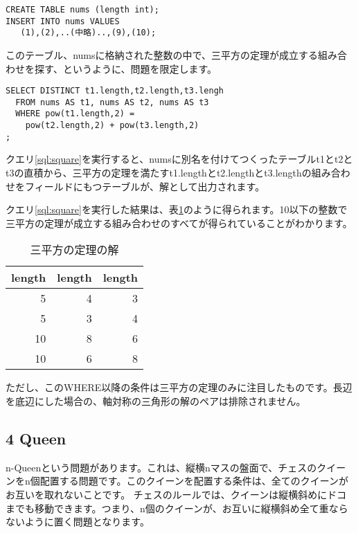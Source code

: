 \begin{lstlisting}[caption=整数テーブル,label=sql:int]
CREATE TABLE nums (length int);
INSERT INTO nums VALUES
   (1),(2),..(中略)..,(9),(10);
\end{lstlisting}

このテーブル、numsに格納された整数の中で、三平方の定理が成立する組み合わせを探す、というように、問題を限定します。

\begin{lstlisting}[caption=三平方の定理の解,label=sql:square]
SELECT DISTINCT t1.length,t2.length,t3.lengh 
  FROM nums AS t1, nums AS t2, nums AS t3
  WHERE pow(t1.length,2) = 
    pow(t2.length,2) + pow(t3.length,2) 
;
\end{lstlisting}

クエリ\ref{sql:square}を実行すると、numsに別名を付けてつくったテーブルt1とt2とt3の直積から、三平方の定理を満たすt1.lengthとt2.lengthとt3.lengthの組み合わせをフィールドにもつテーブルが、解として出力されます。

クエリ\ref{sql:square}を実行した結果は、表\ref{table:square}のように得られます。10以下の整数で三平方の定理が成立する組み合わせのすべてが得られていることがわかります。

\begin{table}[htbp]
  \begin{tabular}{|r|r|r|} \hline
    length & length & length \\ \hline \hline  
    5 & 4 & 3 \\
    5 & 3 & 4 \\
    10 & 8 & 6 \\
    10 & 6 & 8 \\ \hline
  \end{tabular}
  \caption{三平方の定理の解}
  \label{table:square}
\end{table}


ただし、このWHERE以降の条件は三平方の定理のみに注目したものです。長辺を底辺にした場合の、軸対称の三角形の解のペアは排除されません。


\subsection{4 Queen}

n-Queenという問題があります。これは、縦横nマスの盤面で、チェスのクイーンをn個配置する問題です。このクイーンを配置する条件は、全てのクイーンがお互いを取れないことです。
チェスのルールでは、クイーンは縦横斜めにドコまでも移動できます。つまり、n個のクイーンが、お互いに縦横斜め全て重ならないように置く問題となります。


